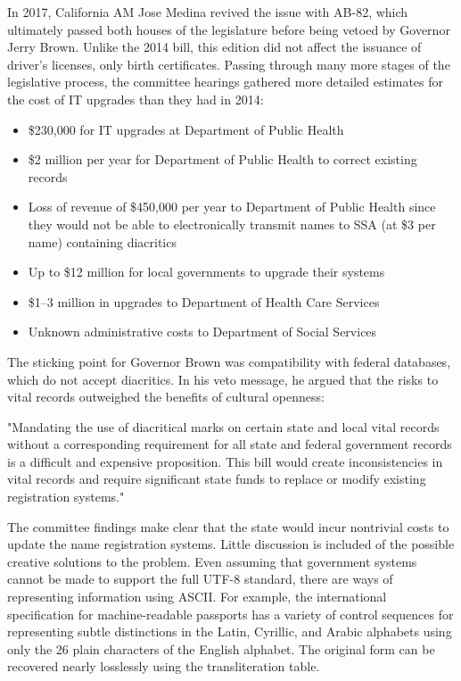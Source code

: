 In 2017, California AM Jose Medina revived the issue with AB-82, which
ultimately passed both houses of the legislature before being vetoed by Governor
Jerry Brown. Unlike the 2014 bill, this edition did not affect the issuance of
driver's licenses, only birth certificates. Passing through many more stages of
the legislative process, the committee hearings gathered more detailed estimates
for the cost of IT upgrades than they had in 2014:

\begin{itemize}

\item \$230,000 for IT upgrades at Department of Public Health
\item \$2 million per year for Department of Public Health to correct existing
records
\item Loss of revenue of \$450,000 per year to Department of Public Health since
they would not be able to electronically transmit names to SSA (at \$3 per name)
containing diacritics
\item Up to \$12 million for local governments to upgrade their systems
\item \$1--3 million in upgrades to Department of Health Care Services
\item Unknown administrative costs to Department of Social Services

\end{itemize}

The sticking point for Governor Brown was compatibility with federal databases,
which do not accept diacritics. In his veto message, he argued that the risks to
vital records outweighed the benefits of cultural openness:

"Mandating the use of diacritical marks on certain state and local vital records
without a corresponding requirement for all state and federal government records
is a difficult and expensive proposition. This bill would create inconsistencies
in vital records and require significant state funds to replace or modify
existing registration systems."

The committee findings make clear that the state would incur nontrivial costs to
update the name registration systems. Little discussion is included of the
possible creative solutions to the problem. Even assuming that government
systems cannot be made to support the full UTF-8 standard, there are ways of
representing information using ASCII. For example, the international
specification for machine-readable passports has a variety of control sequences
for representing subtle distinctions in the Latin, Cyrillic, and Arabic
alphabets using only the 26 plain characters of the English alphabet.  The
original form can be recovered nearly losslessly using the transliteration
table.

